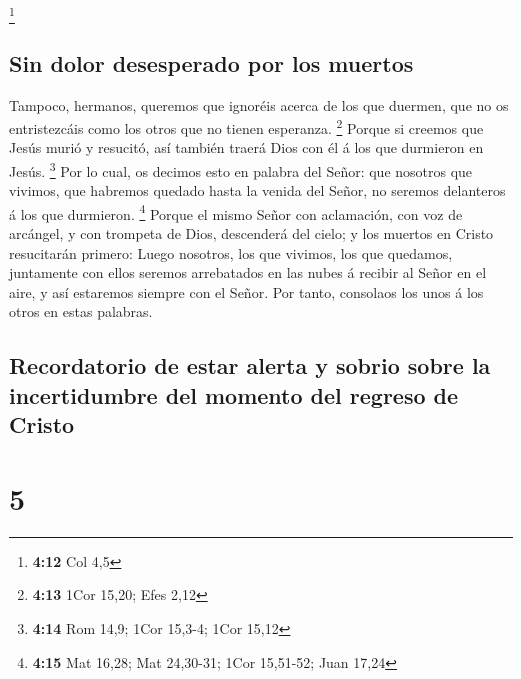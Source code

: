 \footnote{\textbf{4:12} Col 4,5}

\hypertarget{sin-dolor-desesperado-por-los-muertos}{%
\subsection{Sin dolor desesperado por los
muertos}\label{sin-dolor-desesperado-por-los-muertos}}

 Tampoco, hermanos, queremos que ignoréis acerca de los que
duermen, que no os entristezcáis como los otros que no tienen esperanza.
\footnote{\textbf{4:13} 1Cor 15,20; Efes 2,12}  Porque si
creemos que Jesús murió y resucitó, así también traerá Dios con él á los
que durmieron en Jesús. \footnote{\textbf{4:14} Rom 14,9; 1Cor 15,3-4;
  1Cor 15,12}  Por lo cual, os decimos esto en palabra del
Señor: que nosotros que vivimos, que habremos quedado hasta la venida
del Señor, no seremos delanteros á los que durmieron. \footnote{\textbf{4:15}
  Mat 16,28; Mat 24,30-31; 1Cor 15,51-52; Juan 17,24} 
Porque el mismo Señor con aclamación, con voz de arcángel, y con
trompeta de Dios, descenderá del cielo; y los muertos en Cristo
resucitarán primero:  Luego nosotros, los que vivimos, los
que quedamos, juntamente con ellos seremos arrebatados en las nubes á
recibir al Señor en el aire, y así estaremos siempre con el Señor.
 Por tanto, consolaos los unos á los otros en estas
palabras.

\hypertarget{recordatorio-de-estar-alerta-y-sobrio-sobre-la-incertidumbre-del-momento-del-regreso-de-cristo}{%
\subsection{Recordatorio de estar alerta y sobrio sobre la incertidumbre
del momento del regreso de
Cristo}\label{recordatorio-de-estar-alerta-y-sobrio-sobre-la-incertidumbre-del-momento-del-regreso-de-cristo}}

\hypertarget{section-4}{%
\section{5}\label{section-4}}

